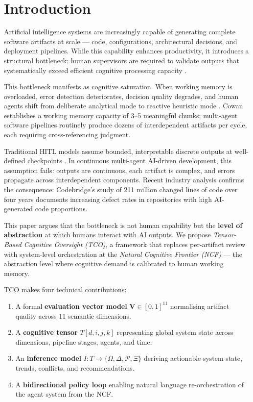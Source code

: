 \documentclass[manuscript,review,anonymous]{acmart}
\begin{document}
\maketitle

\section{Introduction}

Artificial intelligence systems are increasingly capable of generating complete software
artifacts at scale --- code, configurations, architectural decisions, and deployment
pipelines. While this capability enhances productivity, it introduces a structural
bottleneck: human supervisors are required to validate outputs that systematically
exceed efficient cognitive processing capacity \cite{sweller1988}.

This bottleneck manifests as cognitive saturation. When working memory is overloaded,
error detection deteriorates, decision quality degrades, and human agents shift from
deliberate analytical mode to reactive heuristic mode \cite{sweller2011}. Cowan
\cite{cowan2001} establishes a working memory capacity of 3--5 meaningful chunks;
multi-agent software pipelines routinely produce dozens of interdependent artifacts per
cycle, each requiring cross-referencing judgment.

Traditional HITL models assume bounded, interpretable discrete outputs at well-defined
checkpoints \cite{hitlreview2025}. In continuous multi-agent AI-driven development,
this assumption fails: outputs are continuous, each artifact is complex, and errors
propagate across interdependent components. Recent industry analysis confirms the
consequence: Codebridge's study of 211 million changed lines of code over four years
\cite{codebridge2025} documents increasing defect rates in repositories with high
AI-generated code proportions.

This paper argues that the bottleneck is not human capability but the \textbf{level of
abstraction} at which humans interact with AI outputs. We propose
\textit{Tensor-Based Cognitive Oversight (TCO)}, a framework that replaces
per-artifact review with system-level orchestration at the
\textit{Natural Cognitive Frontier (NCF)} --- the abstraction level where cognitive
demand is calibrated to human working memory.

TCO makes four technical contributions:
\begin{enumerate}
  \item A formal \textbf{evaluation vector model} $\mathbf{V} \in [0,1]^{11}$ normalising
    artifact quality across 11 semantic dimensions.
  \item A \textbf{cognitive tensor} $T[d,i,j,k]$ representing global system state
    across dimensions, pipeline stages, agents, and time.
  \item An \textbf{inference model} $I: T \rightarrow \{\Omega, \Delta, \mathcal{P}, \Xi\}$
    deriving actionable system state, trends, conflicts, and recommendations.
  \item A \textbf{bidirectional policy loop} enabling natural language re-orchestration
    of the agent system from the NCF.
\end{enumerate}
\end{document}
